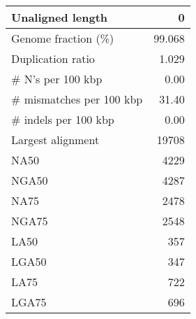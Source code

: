 \documentclass[12pt,a4paper]{article}
\begin{document}
\begin{table}[ht]
\begin{center}
\begin{tabular}{|l*{1}{|r}|}
Unaligned length & 0 \\ \hline
Genome fraction (\%) & 99.068 \\ \hline
Duplication ratio & 1.029 \\ \hline
\# N's per 100 kbp & 0.00 \\ \hline
\# mismatches per 100 kbp & 31.40 \\ \hline
\# indels per 100 kbp & 0.00 \\ \hline
Largest alignment & 19708 \\ \hline
NA50 & 4229 \\ \hline
NGA50 & 4287 \\ \hline
NA75 & 2478 \\ \hline
NGA75 & 2548 \\ \hline
LA50 & 357 \\ \hline
LGA50 & 347 \\ \hline
LA75 & 722 \\ \hline
LGA75 & 696 \\ \hline
\end{tabular}
\end{center}
\end{table}
\end{document}
